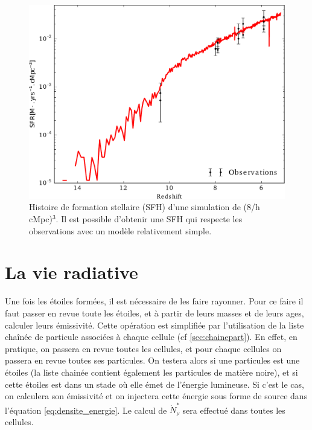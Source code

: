 \begin{figure}[bth]
        \includegraphics[width=.95\linewidth]{img/02/SFR.pdf}
        \caption{Histoire de formation stellaire (SFH) d'une simulation de (8/h cMpc)$^3$.
        Il est possible d'obtenir une SFH qui respecte les observations avec un modèle relativement simple.
}
 		\label{fig:test_SFH}
\end{figure}


\section{La vie radiative}


Une fois les étoiles formées, il est nécessaire de les faire rayonner.
Pour ce faire il faut passer en revue toute les étoiles, et à partir de leurs masses et de leurs ages, calculer leurs émissivité.
Cette opération est simplifiée par l'utilisation de la liste chaînée de particule associées à chaque cellule (cf \ref{sec:chainepart}).
En effet, en pratique, on passera en revue toutes les cellules, et pour chaque cellules on passera en revue toutes ses particules.
On testera alors si une particules est une étoiles (la liste chainée contient également les particules de matière noire), et si cette étoiles est dans un stade où elle émet de l'énergie lumineuse.
Si c'est le cas, on calculera son émissivité et on injectera cette énergie sous forme de source dans l'équation \ref{eq:densite_energie}.
Le calcul de $\dot{N}_\nu^*$ sera effectué dans toutes les cellules.


